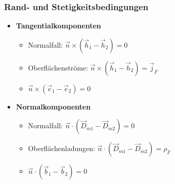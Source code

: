 {	 \subsubsection{Rand- und Stetigkeitsbedingungen}
	 \begin{itemize}
	 	\itemsep0pt
		\item \textbf{Tangentialkomponenten}
		\begin{itemize}
			\itemsep0pt
			\item Normalfall: \(\vec{n}\times\left(\vec{h}_1 - \vec{h}_2\right) = 0\)
			\item Oberflächenströme: \(\vec{n}\times\left(\vec{h}_1 - \vec{h}_2\right) = \vec{j}_F\)
			\item \(\vec{n}\times\left(\vec{e}_1 - \vec{e}_2\right) = 0\)
		\end{itemize}
		\item \textbf{Normalkomponenten}
		\begin{itemize}
			\itemsep0pt
			\item Normalfall: \(\vec{n}\cdot\left(\vec{D}_{m1} - \vec{D}_{m2}\right) = 0\)
			\item Oberflächenladungen: \(\vec{n}\cdot\left(\vec{D}_{m1} - \vec{D}_{m2}\right) = \rho_F\)
			\item \(\vec{n}\cdot\left(\vec{b}_1 - \vec{b}_2\right) = 0\)
		\end{itemize}
	 \end{itemize}
	 }


